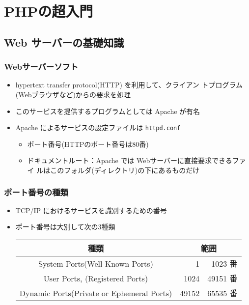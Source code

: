 \section{PHPの超入門}
\subsection{Web サーバーの基礎知識}
\begin{frame}[containsverbatim]
\frametitle{Webサーバーソフト}
\begin{itemize}
 \item hypertext transfer protocol(HTTP) を利用して、クライアン
トプログラム(Webブラウザなど)からの要求を処理
 \item このサービスを提供するプログラムとしては Apache が有名
 \item Apache によるサービスの設定ファイルは
       {\texttt{httpd.conf}}
\begin{itemize}
 \item ポート番号(HTTPのポート番号は80番)
 \item ドキュメントルート：Apache では Webサーバーに直接要求できるファイ
       ルはこのフォルダ(ディレクトリ)の下にあるものだけ
\end{itemize}
\end{itemize}
\end{frame}
\begin{frame}[containsverbatim]
\frametitle{ポート番号の種類}
\begin{itemize}
 \item TCP/IP におけるサービスを識別するための番号
 \item ポート番号は大別して次の3種類
\begin{center}
 \begin{tabular}{|c|r@{番$\sim$}r<{番}|%
}
\hline
種類 &\multicolumn{2}{c|}{範囲}%
 \\\hline
  System Ports(Well Known Ports)& 1&1023 %
\\ \hline
  User Ports, (Registered Ports)& 1024&49151 %
\\  \hline
  Dynamic Ports(Private or Ephemeral Ports)& 49152& 65535%
 \\ \hline
 \end{tabular}
\end{center}
\end{itemize}
\end{frame}
